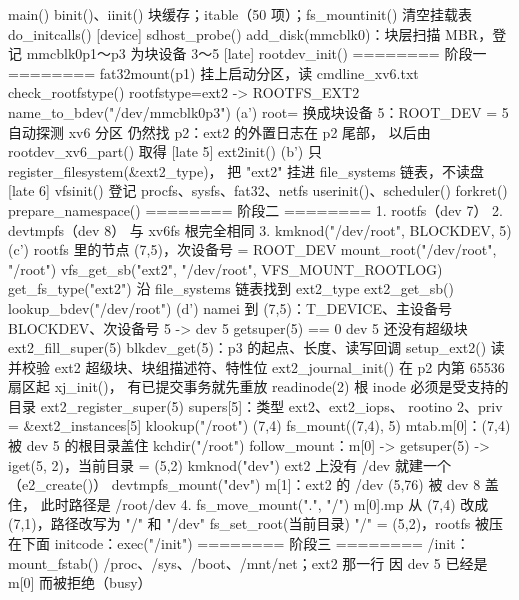 \begin{txtcode}
main()
  binit()、iinit()                     块缓存；itable（50 项）；fs_mountinit() 清空挂载表
  do_initcalls()
    [device] sdhost_probe()            add_disk(mmcblk0)：块层扫描 MBR，登记
                                       mmcblk0p1～p3 为块设备 3～5
    [late]   rootdev_init()            ======== 阶段一 ========
      fat32mount(p1)                   挂上启动分区，读 cmdline_xv6.txt
      check_rootfstype()               rootfstype=ext2 -> ROOTFS_EXT2
      name_to_bdev("/dev/mmcblk0p3")
                                  (a') root= 换成块设备 5：ROOT_DEV = 5
      自动探测 xv6 分区                仍然找 p2：ext2 的外置日志在 p2 尾部，
                                       以后由 rootdev_xv6_part() 取得
    [late 5] ext2init()           (b') 只 register_filesystem(&ext2_type)，
                                       把 "ext2" 挂进 file_systems 链表，不读盘
    [late 6] vfsinit()                 登记 procfs、sysfs、fat32、netfs
  userinit()、scheduler()
forkret()
  prepare_namespace()                  ======== 阶段二 ========
    1. rootfs（dev 7） 2. devtmpfs（dev 8）
                                       与 xv6fs 根完全相同
    3. kmknod("/dev/root", BLOCKDEV, 5)
                                  (c') rootfs 里的节点 (7,5)，次设备号 = ROOT_DEV
       mount_root("/dev/root", "/root")
         vfs_get_sb("ext2", "/dev/root", VFS_MOUNT_ROOTLOG)
           get_fs_type("ext2")         沿 file_systems 链表找到 ext2_type
           ext2_get_sb()
             lookup_bdev("/dev/root")
                                  (d') namei 到 (7,5)：T_DEVICE、主设备号
                                       BLOCKDEV、次设备号 5 -> dev 5
             getsuper(5) == 0          dev 5 还没有超级块
             ext2_fill_super(5)        blkdev_get(5)：p3 的起点、长度、读写回调
               setup_ext2()            读并校验 ext2 超级块、块组描述符、特性位
               ext2_journal_init()     在 p2 内第 65536 扇区起 xj_init()，
                                       有已提交事务就先重放
               readinode(2)            根 inode 必须是受支持的目录
               ext2_register_super(5)  supers[5]：类型 ext2、ext2_iops、
                                       rootino 2、priv = &ext2_instances[5]
         klookup("/root")              (7,4)
         fs_mount((7,4), 5)            mtab.m[0]：(7,4) 被 dev 5 的根目录盖住
       kchdir("/root")                 follow_mount：m[0] -> getsuper(5)
                                       -> iget(5, 2)，当前目录 = (5,2)
       kmknod("dev")                   ext2 上没有 /dev 就建一个（e2_create()）
       devtmpfs_mount("dev")           m[1]：ext2 的 /dev (5,76) 被 dev 8 盖住，
                                       此时路径是 /root/dev
    4. fs_move_mount(".", "/")         m[0].mp 从 (7,4) 改成 (7,1)，路径改写为
                                       "/" 和 "/dev"
       fs_set_root(当前目录)           "/" = (5,2)，rootfs 被压在下面
initcode：exec("/init")                ======== 阶段三 ========
  /init：mount_fstab()                 /proc、/sys、/boot、/mnt/net；ext2 那一行
                                       因 dev 5 已经是 m[0] 而被拒绝（busy）
\end{txtcode}

